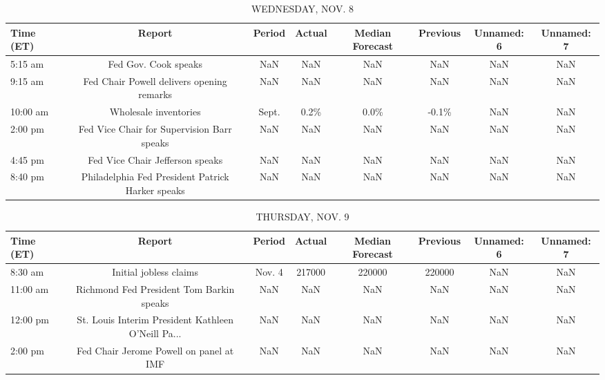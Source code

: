 \documentclass{article}%
\begin{document}
%


\begin{table}[htbp]%
\caption{WEDNESDAY, NOV. 8}%
\centering%
\begin{adjustbox}{width=1\textwidth}%
\begin{tabular}{lccccccc}
\toprule
Time (ET) &                                           Report & Period & Actual & Median Forecast & Previous & Unnamed: 6 & Unnamed: 7 \\
\midrule
  5:15 am &                             Fed Gov. Cook speaks &    NaN &    NaN &             NaN &      NaN &        NaN &        NaN \\
  9:15 am &        Fed Chair Powell delivers opening remarks &    NaN &    NaN &             NaN &      NaN &        NaN &        NaN \\
 10:00 am &                            Wholesale inventories &  Sept. &   0.2\% &            0.0\% &    -0.1\% &        NaN &        NaN \\
  2:00 pm &       Fed Vice Chair for Supervision Barr speaks &    NaN &    NaN &             NaN &      NaN &        NaN &        NaN \\
  4:45 pm &                  Fed Vice Chair Jefferson speaks &    NaN &    NaN &             NaN &      NaN &        NaN &        NaN \\
  8:40 pm & Philadelphia Fed President Patrick Harker speaks &    NaN &    NaN &             NaN &      NaN &        NaN &        NaN \\
\bottomrule
\end{tabular}
%
\end{adjustbox}%
\end{table}

%


\begin{table}[htbp]%
\caption{THURSDAY, NOV. 9}%
\centering%
\begin{adjustbox}{width=1\textwidth}%
\begin{tabular}{lccccccc}
\toprule
Time (ET) &                                             Report & Period & Actual & Median Forecast & Previous & Unnamed: 6 & Unnamed: 7 \\
\midrule
  8:30 am &                             Initial jobless claims & Nov. 4 & 217000 &          220000 &   220000 &        NaN &        NaN \\
 11:00 am &           Richmond Fed President Tom Barkin speaks &    NaN &    NaN &             NaN &      NaN &        NaN &        NaN \\
 12:00 pm & St. Louis Interim President Kathleen O'Neill Pa... &    NaN &    NaN &             NaN &      NaN &        NaN &        NaN \\
  2:00 pm &            Fed Chair Jerome Powell on panel at IMF &    NaN &    NaN &             NaN &      NaN &        NaN &        NaN \\
\bottomrule
\end{tabular}
%
\end{adjustbox}%
\end{table}
\end{document}
